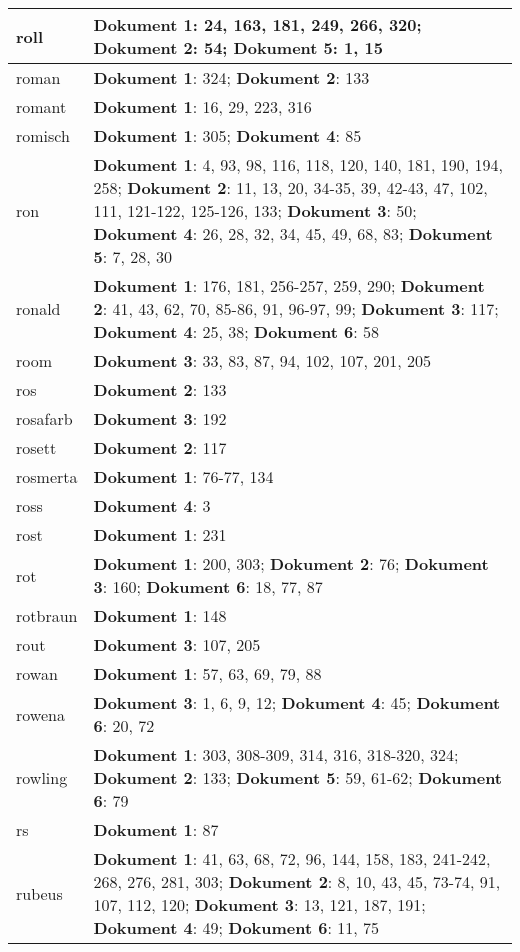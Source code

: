 \documentclass[a5paper]{article}
\begin{document}
\begin{longtable}[l]{|l|p{3in}|}
\hline
roll & \textbf{Dokument 1}: 24, 163, 181, 249, 266, 320; \textbf{Dokument 2}: 54; \textbf{Dokument 5}: 1, 15 \\
\hline
roman & \textbf{Dokument 1}: 324; \textbf{Dokument 2}: 133 \\
\hline
romant & \textbf{Dokument 1}: 16, 29, 223, 316 \\
\hline
romisch & \textbf{Dokument 1}: 305; \textbf{Dokument 4}: 85 \\
\hline
ron & \textbf{Dokument 1}: 4, 93, 98, 116, 118, 120, 140, 181, 190, 194, 258; \textbf{Dokument 2}: 11, 13, 20, 34-35, 39, 42-43, 47, 102, 111, 121-122, 125-126, 133; \textbf{Dokument 3}: 50; \textbf{Dokument 4}: 26, 28, 32, 34, 45, 49, 68, 83; \textbf{Dokument 5}: 7, 28, 30 \\
\hline
ronald & \textbf{Dokument 1}: 176, 181, 256-257, 259, 290; \textbf{Dokument 2}: 41, 43, 62, 70, 85-86, 91, 96-97, 99; \textbf{Dokument 3}: 117; \textbf{Dokument 4}: 25, 38; \textbf{Dokument 6}: 58 \\
\hline
room & \textbf{Dokument 3}: 33, 83, 87, 94, 102, 107, 201, 205 \\
\hline
ros & \textbf{Dokument 2}: 133 \\
\hline
rosafarb & \textbf{Dokument 3}: 192 \\
\hline
rosett & \textbf{Dokument 2}: 117 \\
\hline
rosmerta & \textbf{Dokument 1}: 76-77, 134 \\
\hline
ross & \textbf{Dokument 4}: 3 \\
\hline
rost & \textbf{Dokument 1}: 231 \\
\hline
rot & \textbf{Dokument 1}: 200, 303; \textbf{Dokument 2}: 76; \textbf{Dokument 3}: 160; \textbf{Dokument 6}: 18, 77, 87 \\
\hline
rotbraun & \textbf{Dokument 1}: 148 \\
\hline
rout & \textbf{Dokument 3}: 107, 205 \\
\hline
rowan & \textbf{Dokument 1}: 57, 63, 69, 79, 88 \\
\hline
rowena & \textbf{Dokument 3}: 1, 6, 9, 12; \textbf{Dokument 4}: 45; \textbf{Dokument 6}: 20, 72 \\
\hline
rowling & \textbf{Dokument 1}: 303, 308-309, 314, 316, 318-320, 324; \textbf{Dokument 2}: 133; \textbf{Dokument 5}: 59, 61-62; \textbf{Dokument 6}: 79 \\
\hline
rs & \textbf{Dokument 1}: 87 \\
\hline
rubeus & \textbf{Dokument 1}: 41, 63, 68, 72, 96, 144, 158, 183, 241-242, 268, 276, 281, 303; \textbf{Dokument 2}: 8, 10, 43, 45, 73-74, 91, 107, 112, 120; \textbf{Dokument 3}: 13, 121, 187, 191; \textbf{Dokument 4}: 49; \textbf{Dokument 6}: 11, 75 \\

\end{longtable}
\end{document}
